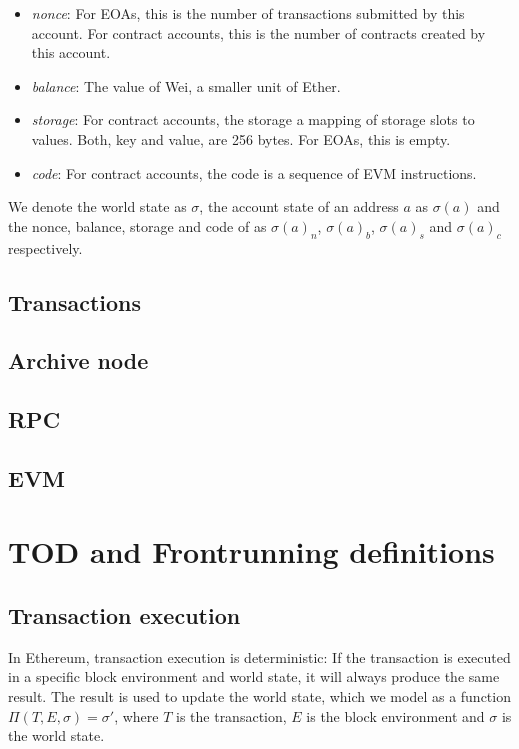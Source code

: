 \documentclass[draft,final]{vutinfth} %
\begin{document}
\begin{itemize}
    \item \emph{nonce}: For EOAs, this is the number of transactions submitted by this account. For contract accounts, this is the number of contracts created by this account.
    \item \emph{balance}: The value of Wei, a smaller unit of Ether.
    \item \emph{storage}: For contract accounts, the storage a mapping of storage slots to values. Both, key and value, are 256 bytes. For EOAs, this is empty.
    \item \emph{code}: For contract accounts, the code is a sequence of EVM instructions.
\end{itemize}

We denote the world state as $\sigma$, the account state of an address $a$ as $\sigma(a)$ and the nonce, balance, storage and code of as $\sigma(a)_n$, $\sigma(a)_b$, $\sigma(a)_s$ and $\sigma(a)_c$ respectively.

\section{Transactions}

\section{Archive node}

\section{RPC}

\section{EVM}


\chapter{TOD and Frontrunning definitions}

\section{Transaction execution}

In Ethereum, transaction execution is deterministic: If the transaction is executed in a specific block environment and world state, it will always produce the same result. The result is used to update the world state, which we model as a function $\Pi(T, E, \sigma) = \sigma\prime$, where $T$ is the transaction, $E$ is the block environment and $\sigma$ is the world state.
\end{document}
